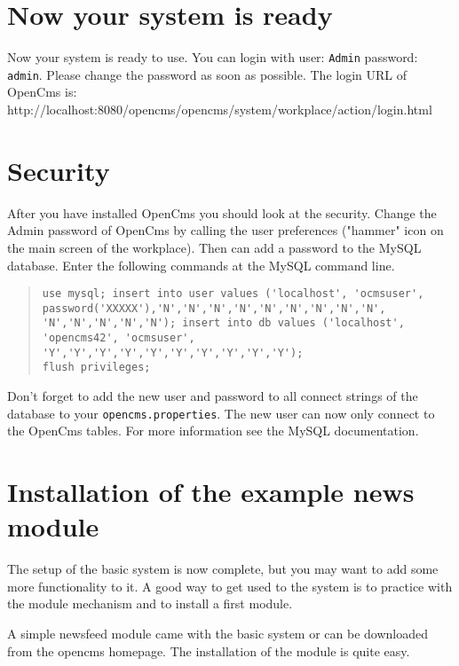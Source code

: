 \section{Now your system is ready}
Now your system is ready to use. You can login with user:
\texttt{Admin} password: \texttt{admin}. Please change the
password as soon as possible. The login URL of OpenCms is:\\
{http://localhost:8080/opencms/opencms/system/workplace/action/login.html}

\section{Security}
After you have installed OpenCms you should look at the security.
Change the Admin password of OpenCms by calling the user
preferences ("hammer" icon on the main screen of the workplace).
Then can add a password to the MySQL database. Enter the following
commands
at the MySQL command line.\\

\begin{quote}
\begin{verbatim}
use mysql; insert into user values ('localhost', 'ocmsuser',
password('XXXXX'),'N','N','N','N','N','N','N','N','N',
'N','N','N','N','N'); insert into db values ('localhost',
'opencms42', 'ocmsuser', 'Y','Y','Y','Y','Y','Y','Y','Y','Y','Y');
flush privileges;
\end{verbatim}
\end{quote}

Don't forget to add the new user and password to all connect
strings of the database to your \texttt{opencms.properties}. The
new user can now only connect to the OpenCms tables. For more
information see the MySQL documentation.

\section{Installation of the example news module}

The setup of the basic system is now complete, but you may want to
add some more functionality to it. A good way to get used to the
system is to practice with the module mechanism and to install a
first module.

A simple newsfeed module came with the basic system or can be
downloaded from the opencms homepage. The installation of the
module is quite easy.

